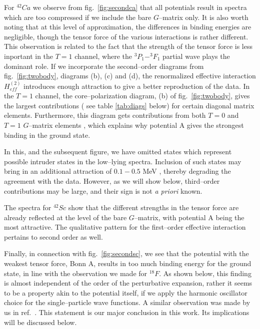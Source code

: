 For $^{42}Ca$ we observe from fig.\ \ref{fig:secondca} that all potentials
result in spectra which are too compressed if we include the bare $G$--matrix
only. It is also worth  noting that at this level of approximation, the
differences in binding energies are negligible, though the tensor force
of the various interactions is rather different. This observation
is related to the fact that the strength of the tensor force is less
inportant in the $T=1$ channel, where the $^{3}P_1 - ^{3}F_1$ partial
wave plays the dominant role.
If we incorporate the
second--order diagrams from fig.\ \ref{fig:twobody}, diagrams (b), (c) and (d),
the renormalized effective interaction $H_{eff}^{(2)}$ introduces
enough attraction to give a better reproduction of the data. In the $T=1$
channel, the core--polarization diagram, (b) of fig.\
\ref{fig:twobody}, gives the largest contributions ( see table \ref{tab:diags}
below) for certain diagonal matrix elements.
Furthermore, this diagram gets contributions from both $T=0$ and $T=1$ $G$--matrix
elements
, which explains why potential A gives the strongest binding 
in the ground state.


In this, and the subsequent figure, we have omitted states
which represent possible intruder states in the low--lying spectra.
Inclusion of such states may bring in an additional attraction
of $0.1-0.5$ MeV \cite{ee70}, thereby degrading the agreement with
the data. However, as we will show below, third--order contributions
may be large, and their sign is not {\em a priori} known.


The spectra for $^{42}Sc$ show that the different  strengths in the tensor
force are already reflected at the level of the bare $G$--matrix, with
potential A being the most attractive. The qualitative pattern for the
first--order effective interaction pertains to second order as well.


Finally, in connection with fig.\ \ref{fig:secondsc}, we see that
the potential with the weakest tensor force, Bonn A,
results in too much binding
energy for the ground state, in line with the  observation we made
for $^{18}F$. As shown below, this finding is almost independent of the order
of the perturbative expansion, rather it seems to be a property akin
to the potential itself, if we apply the harmonic oscillator
choice for the single--particle wave functions. 
A similar observation was made by us in ref.\
\cite{heho92}. This statement is our major
conclusion in this work. Its implications will be discussed below.




